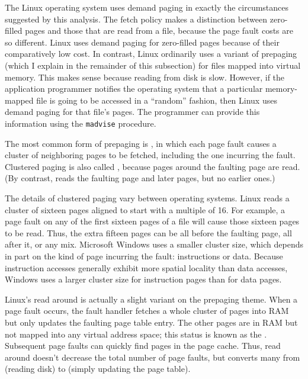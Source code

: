 The Linux operating system uses demand paging in exactly the
circumstances suggested by this analysis.  The fetch policy makes a
distinction between zero-filled pages and those that are read from a
file, because the page fault costs are so different.  Linux uses
demand paging for zero-filled pages because of their comparatively
low cost.  In contrast, Linux ordinarily uses a variant of prepaging
(which I explain in the remainder of this subsection) for files mapped into virtual memory.  This
makes sense because reading from disk is slow.  However, if the
application programmer notifies the operating system that a particular
memory-mapped file is going to be accessed in a ``random'' fashion,
then Linux uses demand paging for that file's pages.  The programmer
can provide this information using the
\verb|madvise| procedure.

The most common form of prepaging is , in
which each page fault causes a cluster of neighboring pages to be
fetched, including the one incurring the fault.  Clustered paging is
also called , because pages around the faulting
page are read.  (By contrast,  reads the faulting
page and later pages, but no earlier ones.)

The details of clustered paging vary between operating systems.  Linux
reads a cluster of sixteen pages aligned to start with a multiple of 16.
For example, a page fault on any of the first sixteen pages of a file will
cause those sixteen pages to be read.  Thus, the extra fifteen pages can be all
before the faulting page, all after it, or any mix.  Microsoft Windows
uses a smaller cluster size, which depends in part on the kind of page
incurring the fault: instructions or data.  Because instruction
accesses generally exhibit more spatial locality than data accesses,
Windows uses a larger cluster size for instruction pages than for data
pages.

Linux's read around is actually a slight variant on the prepaging
theme.  When a page fault occurs, the fault handler fetches a whole
cluster of pages into RAM but only updates the faulting page table
entry.  The other pages are in RAM but not mapped into any virtual
address space; this status is known as the .
Subsequent page faults can quickly find pages in the page cache.  Thus, read around
doesn't decrease the total number of page faults, but converts many
from  (reading disk) to
 (simply updating the page table).

